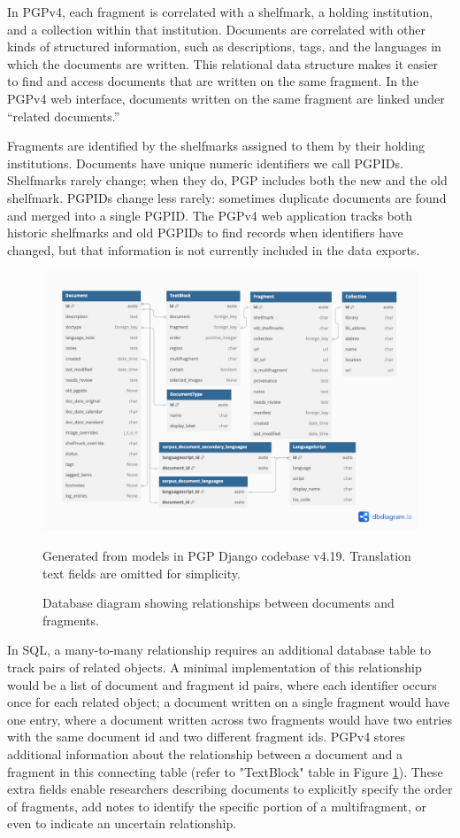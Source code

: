 \documentclass{article}
\begin{document}
In PGPv4, each fragment is correlated with a shelfmark, a holding institution, and a collection within that institution. Documents are correlated with other kinds of structured information, such as descriptions, tags, and the languages in which the documents are written. This relational data structure makes it easier to find and access documents that are written on the same fragment. In the PGPv4 web interface, documents written on the same fragment are linked under “related documents.”

Fragments are identified by the shelfmarks assigned to them by their holding institutions. Documents have unique numeric identifiers we call PGPIDs. Shelfmarks rarely change; when they do, PGP includes both the new and the old shelfmark. PGPIDs change less rarely: sometimes duplicate documents are found and merged into a single PGPID. The PGPv4 web application tracks both historic shelfmarks and old PGPIDs to find records when identifiers have changed, but that information is not currently included in the data exports.

\begin{figure}[!hbt]
  \includegraphics[width=1\linewidth]{db-diagrams/pgp v4.19 documents.png}
  \centering
  \caption{Database diagram showing relationships between documents and fragments.}
  \medskip
    \small
  Generated from models in  PGP Django codebase v4.19. Translation text fields are omitted for simplicity.
  \label{fig:pgpv4_db_documents}
\end{figure}

In SQL, a many-to-many relationship requires an additional database table to track pairs of related objects. A minimal implementation of this relationship would be a list of document and fragment id pairs, where each identifier occurs once for each related object; a document written on a single fragment would have one entry, where a document written across two fragments would have two entries with the same document id and two different fragment ids.  PGPv4 stores additional information about the relationship between a document and a fragment in this connecting table (refer to "TextBlock" table in Figure \ref{fig:pgpv4_db_documents}). These extra fields enable researchers describing documents to explicitly specify the order of fragments, add notes to identify the specific portion of a multifragment, or even to indicate an uncertain relationship. 
\end{document}
